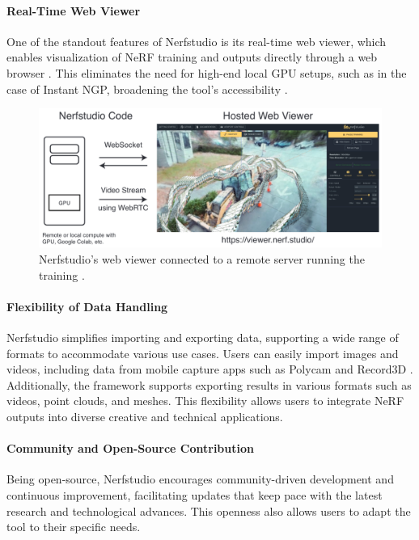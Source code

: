 \paragraph{Real-Time Web Viewer}
One of the standout features of Nerfstudio is its real-time web viewer, which enables visualization of NeRF training and outputs directly through a web browser .
This eliminates the need for high-end local GPU setups, such as in the case of Instant NGP, broadening the tool's accessibility \cite{noauthor_nerfstudio-projectviser_2024}.

\begin{figure}[h!]
  \centering
  \includegraphics[width=\textwidth]{figures/related-nerfstudio-viewer.png}
  \caption{Nerfstudio's web viewer connected to a remote server running the training \cite{tancik_nerfstudio_2023}.}
  \label{fig:nerfstudio-viewer}
\end{figure}

\paragraph{Flexibility of Data Handling}
Nerfstudio simplifies importing and exporting data, supporting a wide range of formats to accommodate various use cases.
Users can easily import images and videos, including data from mobile capture apps such as Polycam \cite{noauthor_polycam_nodate} and Record3D \cite{noauthor_record3d_nodate}.
Additionally, the framework supports exporting results in various formats such as videos, point clouds, and meshes.
This flexibility allows users to integrate NeRF outputs into diverse creative and technical applications.

\paragraph{Community and Open-Source Contribution}
Being open-source, Nerfstudio encourages community-driven development and continuous improvement, facilitating updates that keep pace with the latest research and technological advances.
This openness also allows users to adapt the tool to their specific needs.


